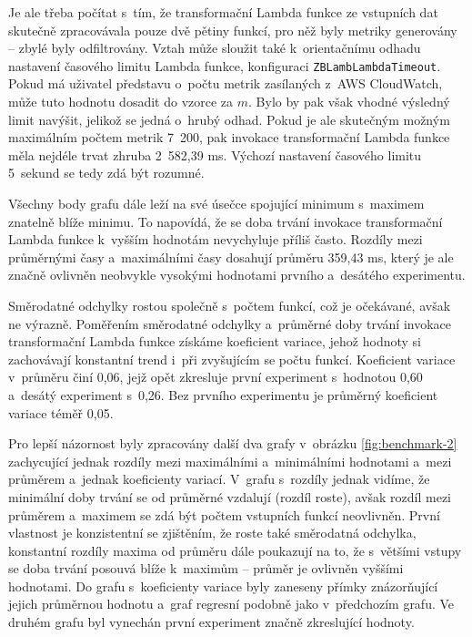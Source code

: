 \documentclass[czech, ing, kiv, he, iso690]{fasthesis}
\begin{document}
Je ale třeba počítat s~tím, že transformační Lambda funkce ze vstupních dat skutečně zpracovávala pouze dvě pětiny funkcí, pro něž byly metriky generovány -- zbylé byly odfiltrovány. Vztah může sloužit také k~orientačnímu odhadu nastavení časového limitu Lambda funkce, konfiguraci \verb|ZBLambLambdaTimeout|. Pokud má uživatel představu o~počtu metrik zasílaných z~AWS CloudWatch, může tuto hodnotu dosadit do vzorce za $m$. Bylo by pak však vhodné výsledný limit navýšit, jelikož se jedná o~hrubý odhad. Pokud je ale skutečným možným maximálním počtem metrik 7~200, pak invokace transformační Lambda funkce měla nejdéle trvat zhruba 2~582,39 ms. Výchozí nastavení časového limitu 5~sekund se tedy zdá být rozumné.

Všechny body grafu dále leží na své úsečce spojující minimum s~maximem znatelně blíže minimu. To napovídá, že se doba trvání invokace transformační Lambda funkce k~vyšším hodnotám nevychyluje příliš často. Rozdíly mezi průměrnými časy a~maximálními časy dosahují průměru 359,43 ms, který je ale značně ovlivněn neobvykle vysokými hodnotami prvního a~desátého experimentu. 

Směrodatné odchylky rostou společně s~počtem funkcí, což je očekávané, avšak ne výrazně. Poměřením směrodatné odchylky a~průměrné doby trvání invokace transformační Lambda funkce získáme koeficient variace, jehož hodnoty si zachovávají konstantní trend i~při zvyšujícím se počtu funkcí. Koeficient variace v~průměru činí 0,06, jejž opět zkresluje první experiment s~hodnotou 0,60 a~desátý experiment s~0,26. Bez prvního experimentu je průměrný koeficient variace téměř 0,05. 

Pro lepší názornost byly zpracovány další dva grafy v~obrázku \ref{fig:benchmark-2} zachycující jednak rozdíly mezi maximálními a~minimálními hodnotami a~mezi průměrem a~jednak koeficienty variací. V~grafu s~rozdíly jednak vidíme, že minimální doby trvání se od průměrné vzdalují (rozdíl roste), avšak rozdíl mezi průměrem a~maximem se zdá být počtem vstupních funkcí neovlivněn.  První vlastnost je konzistentní se zjištěním, že roste také směrodatná odchylka, konstantní rozdíly maxima od průměru dále poukazují na to, že s~většími vstupy se doba trvání posouvá blíže k~maximům -- průměr je ovlivněn vyššími hodnotami. Do grafu s~koeficienty variace byly zaneseny přímky znázorňující jejich průměrnou hodnotu a~graf regresní  podobně jako v~předchozím grafu. Ve druhém grafu byl vynechán první experiment značně zkreslující hodnoty.
\end{document}

